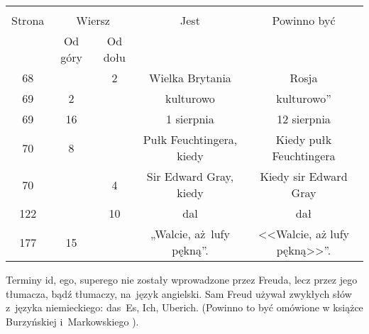 \documentclass[a4paper,11pt]{article}
\begin{document}
\begin{center}

  \begin{tabular}{|c|c|c|c|c|}
    \hline
    & \multicolumn{2}{c|}{} & & \\
    Strona & \multicolumn{2}{c|}{Wiersz} & Jest
                              & Powinno być \\ \cline{2-3}
    & Od góry & Od dołu & & \\
    \hline
    68  & &  2 & Wielka Brytania & Rosja \\
    69  &  2 & & kulturowo & kulturowo'' \\
    69  & 16 & & 1 sierpnia & 12 sierpnia \\
    70  &  8 & & Pułk Feuchtingera, kiedy & Kiedy pułk Feuchtingera \\
    70  & &  4 & Sir Edward Gray, kiedy & Kiedy sir Edward Gray \\
    122 & & 10 & dal & dał \\
    177 & 15 & & „Walcie, aż~lufy pękną”.
           & <<Walcie, aż lufy pękną>>”. \\
    \hline
  \end{tabular}

\end{center}

\vspace{\spaceTwo}








\start {} Terminy id, ego, superego nie zostały wprowadzone
przez Freuda, lecz przez jego tłumacza, bądź tłumaczy, na~język
angielski. Sam Freud używał zwykłych słów z~języka niemieckiego:
das~Es, Ich, Uberich. (Powinno to być omówione w książce Burzyńskiej
i~Markowskiego \cite{BM09}).

\vspace{\spaceFour}
\end{document}
